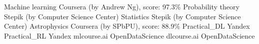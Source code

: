 

\begin{cvextracourses}

	\cvextracourse
		{Machine learning}  
		{Coursera (by Andrew Ng), score: 97.3\%} 
	\cvextracourse
		{Probability theory}  
		{Stepik (by Computer Science Center)} 
	\cvextracourse
		{Statistics}  
		{Stepik (by Computer Science Center)} 
	\cvextracourse
		{Astrophysics} 
		{Coursera (by SPbPU), score: 88.9\%} 
	\cvextracourse
	{Practical\_DL} 
	{Yandex} 
	\cvextracourse
	{Practical\_RL}  
	{Yandex} 
	\cvextracourse
	{mlcourse.ai}
	{OpenDataScience} 
	\cvextracourse
	{dlcourse.ai} 
	{OpenDataScience}
\end{cvextracourses}
